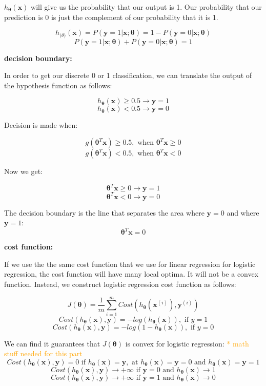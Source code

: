 \documentclass{article}
\begin{document}
\noindent \(h_{\boldsymbol{\theta}}(\textbf{x})\) will give us the probability that our output is 1. Our probability that our prediction is 0 is just the complement of our probability that it is 1.

\[
h_{\boldsymbol(\theta)} (\textbf{x}) 
= P(\textbf{y} = 1 | \textbf{x} ; \boldsymbol{\theta})
= 1 - P(\textbf{y} = 0 | \textbf{x} ; \boldsymbol{\theta})
\]
\[P(\textbf{y} = 1 | \textbf{x} ; \boldsymbol{\theta}) + P(\textbf{y} = 0 | \textbf{x} ; \boldsymbol{\theta}) = 1\]

\noindent \textbf{decision boundary:}

\noindent In order to get our discrete 0 or 1 classification, we can translate the output of the hypothesis function as follows:

\[h_{\boldsymbol{\theta}} (\textbf{x}) \geq 0.5 \rightarrow \textbf{y} = 1\]
\[h_{\boldsymbol{\theta}} (\textbf{x}) < 0.5 \rightarrow \textbf{y} = 0\]

\noindent Decision is made when:

\[g(\boldsymbol{\theta}^T \textbf{x}) \geq 0.5, \text{ when } \boldsymbol{\theta}^T \textbf{x} \geq 0\]
\[g(\boldsymbol{\theta}^T \textbf{x}) < 0.5, \text{ when } \boldsymbol{\theta}^T \textbf{x} < 0\]

\noindent Now we get:

\[\boldsymbol{\theta}^T \textbf{x} \geq 0 \rightarrow \textbf{y} = 1\]
\[\boldsymbol{\theta}^T \textbf{x} < 0 \rightarrow \textbf{y} = 0\]

\noindent The decision boundary is the line that separates the area where \(\textbf{y} = 0\) and where \(\textbf{y} = 1\):
\[\boldsymbol{\theta}^T \textbf{x} = 0\]

\noindent \textbf{cost function:}

\noindent If we use the the same cost function that we use for linear regression for logistic regression, the cost function will have many local optima. It will not be a convex function. Instead, we construct logistic regression cost function as follows:

\[J(\boldsymbol{\theta}) = \frac{1}{m} \sum_{i = 1}^m Cost(h_{\boldsymbol{\theta}}(\textbf{x}^{(i)}), \textbf{y}^{(i)})\]
\[Cost(h_{\boldsymbol{\theta}}(\textbf{x}), \textbf{y}) = -log(h_{\boldsymbol{\theta}}(\textbf{x})), \text{ if } y = 1\]
\[Cost(h_{\boldsymbol{\theta}}(\textbf{x}), \textbf{y}) = -log(1 - h_{\boldsymbol{\theta}}(\textbf{x})), \text{ if } y = 0\]

\noindent We can find it guarantees that \(J(\boldsymbol{\theta})\) is convex for logistic regression: \textcolor{orange}{ * math stuff needed for this part}
\[
Cost(h_{\boldsymbol{\theta}}(\textbf{x}), \textbf{y}) = 0 \text{ if }
h_{\boldsymbol{\theta}}(\textbf{x}) = \textbf{y}, \text{ at } h_{\boldsymbol{\theta}}(\textbf{x}) = \textbf{y} = 0 \text{ and } 
h_{\boldsymbol{\theta}}(\textbf{x}) = \textbf{y} = 1
\]
\[
Cost(h_{\boldsymbol{\theta}}(\textbf{x}), \textbf{y}) \rightarrow +\infty
\text{ if } \textbf{y} = 0 \text{ and }
h_{\boldsymbol{\theta}}(\textbf{x}) \rightarrow 1
\]
\[
Cost(h_{\boldsymbol{\theta}}(\textbf{x}), \textbf{y}) \rightarrow +\infty
\text{ if } \textbf{y} = 1 \text{ and }
h_{\boldsymbol{\theta}}(\textbf{x}) \rightarrow 0
\]
\end{document}
